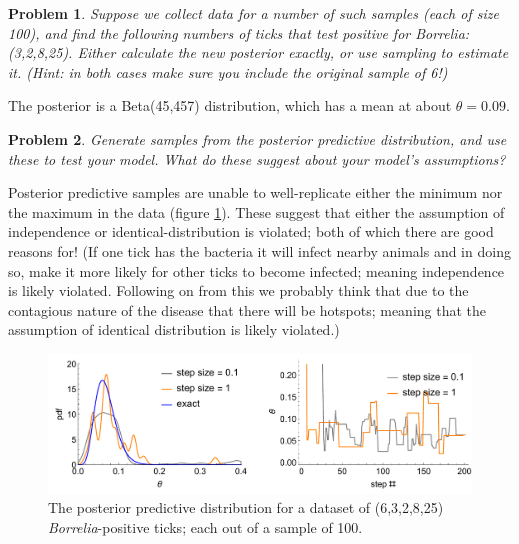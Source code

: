 \documentclass{article}
\newtheorem{problem}{Problem}[section]
\begin{document}
\begin{problem}
Suppose we collect data for a number of such samples (each of size 100), and find the following numbers of ticks that test positive for \textit{Borrelia}: (3,2,8,25). Either calculate the new posterior exactly, or use sampling to estimate it. (Hint: in both cases make sure you include the original sample of 6!)
\end{problem}

The posterior is a Beta(45,457) distribution, which has a mean at about $\theta = 0.09$.

\begin{problem}
Generate samples from the posterior predictive distribution, and use these to test your model. What do these suggest about your model's assumptions?
\end{problem}

Posterior predictive samples are unable to well-replicate either the minimum nor the maximum in the data (figure \ref{fig:ticks_newDataPPCs}). These suggest that either the assumption of independence or identical-distribution is violated; both of which there are good reasons for! (If one tick has the bacteria it will infect nearby animals and in doing so, make it more likely for other ticks to become infected; meaning independence is likely violated. Following on from this we probably think that due to the contagious nature of the disease that there will be hotspots; meaning that the assumption of identical distribution is likely violated.)

\begin{figure}[ht]
\centerline{\includegraphics[width=1\textwidth]{../figures/prob3_ticksStepSizeLarge.pdf}}
\caption{The posterior predictive distribution for a dataset of (6,3,2,8,25) \textit{Borrelia}-positive ticks; each out of a sample of 100.}\label{fig:ticks_newDataPPCs}
\end{figure}



 

\end{document}
